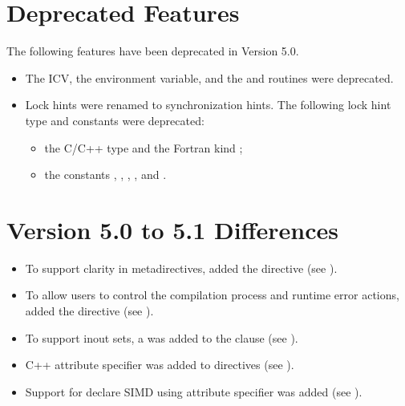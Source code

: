 \section{Deprecated Features}
\label{chap:Deprecated Features}

The following features have been deprecated in Version 5.0.

\begin{itemize}
\item The  ICV, the  environment variable, and
      the  and  routines were deprecated.

\item Lock hints were renamed to synchronization hints. The following lock hint 
      type and constants were deprecated:

\begin{itemize}
\item the C/C++ type  and the Fortran kind
      ;

\item the constants ,
      , ,
      , and .
\end{itemize}
\end{itemize}


\section{Version 5.0 to 5.1 Differences}
\label{sec:Version 5.0 to 5.1 Differences}
\begin{itemize}
\item To support clarity in metadirectives, added the  
      directive (see ).

\item To allow users to control the compilation process and runtime error 
      actions, added the  directive 
      (see ).

\item To support inout sets, a   was
      added to the  clause (see ).

\item C++ attribute specifier was added to directives (see ).

\item Support for declare SIMD using attribute specifier was added (see ).
\end{itemize}


